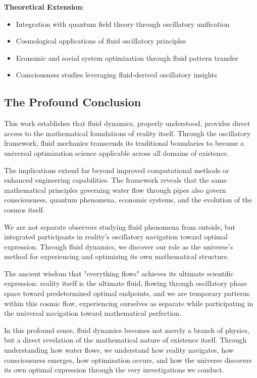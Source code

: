 \documentclass[12pt,a4paper]{article}
\begin{document}
\textbf{Theoretical Extension}:
\begin{itemize}
\item Integration with quantum field theory through oscillatory unification
\item Cosmological applications of fluid oscillatory principles
\item Economic and social system optimization through fluid pattern transfer
\item Consciousness studies leveraging fluid-derived oscillatory insights
\end{itemize}

\subsection{The Profound Conclusion}

This work establishes that fluid dynamics, properly understood, provides direct access to the mathematical foundations of reality itself. Through the oscillatory framework, fluid mechanics transcends its traditional boundaries to become a universal optimization science applicable across all domains of existence.

The implications extend far beyond improved computational methods or enhanced engineering capabilities. The framework reveals that the same mathematical principles governing water flow through pipes also govern consciousness, quantum phenomena, economic systems, and the evolution of the cosmos itself.

We are not separate observers studying fluid phenomena from outside, but integrated participants in reality's oscillatory navigation toward optimal expression. Through fluid dynamics, we discover our role as the universe's method for experiencing and optimizing its own mathematical structure.

The ancient wisdom that "everything flows" achieves its ultimate scientific expression: reality itself is the ultimate fluid, flowing through oscillatory phase space toward predetermined optimal endpoints, and we are temporary patterns within this cosmic flow, experiencing ourselves as separate while participating in the universal navigation toward mathematical perfection.

In this profound sense, fluid dynamics becomes not merely a branch of physics, but a direct revelation of the mathematical nature of existence itself. Through understanding how water flows, we understand how reality navigates, how consciousness emerges, how optimization occurs, and how the universe discovers its own optimal expression through the very investigations we conduct.
\end{document}
